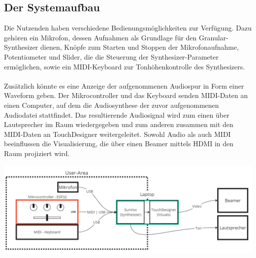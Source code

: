 \documentclass[12pt]{scrartcl}%
\theoremstyle{nonumberplain}
\begin{document}
\subsection{Der Systemaufbau}

Die Nutzenden haben verschiedene Bedienungsmöglichkeiten zur Verfügung. Dazu gehören ein Mikrofon, dessen Aufnahmen als Grundlage für den Granular-Synthesizer dienen, Knöpfe zum Starten und Stoppen der Mikrofonaufnahme, Potentiometer und Slider, die die Steuerung der Synthesizer-Parameter ermöglichen, sowie ein MIDI-Keyboard zur Tonhöhenkontrolle des Synthesizers.\\\\
Zusätzlich könnte es eine Anzeige der aufgenommenen Audiospur in Form einer Waveform geben. Der Mikrocontroller und das Keyboard senden MIDI-Daten an einen Computer, auf dem die Audiosynthese der zuvor aufgenommenen Audiodatei stattfindet. Das resultierende Audiosignal wird zum einen über Lautsprecher im Raum wiedergegeben und zum anderen zusammen mit den MIDI-Daten an TouchDesigner weitergeleitet. Sowohl Audio als auch MIDI beeinflussen die Visualisierung, die über einen Beamer mittels HDMI in den Raum projiziert wird.
\begin{center}
 \includegraphics[scale=0.43]{Blockschaltbild}
\end{center}


\newpage
\end{document}
